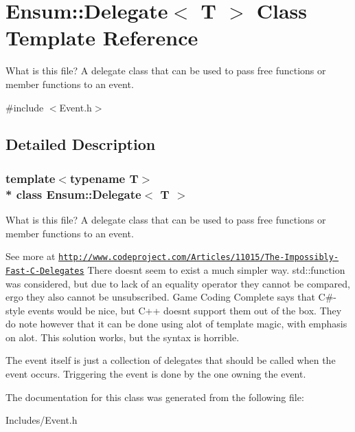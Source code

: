 \hypertarget{class_ensum_1_1_delegate}{}\section{Ensum\+:\+:Delegate$<$ T $>$ Class Template Reference}
\label{class_ensum_1_1_delegate}


What is this file? A delegate class that can be used to pass free functions or member functions to an event.  




{\ttfamily \#include $<$Event.\+h$>$}



\subsection{Detailed Description}
\subsubsection*{template$<$typename T$>$\\*
class Ensum\+::\+Delegate$<$ T $>$}

What is this file? A delegate class that can be used to pass free functions or member functions to an event. 

See more at \href{http://www.codeproject.com/Articles/11015/The-Impossibly-Fast-C-Delegates}{\tt http\+://www.\+codeproject.\+com/\+Articles/11015/\+The-\/\+Impossibly-\/\+Fast-\/\+C-\/\+Delegates} There doesn\textquotesingle{}t seem to exist a much simpler way. std\+::function was considered, but due to lack of an equality operator they cannot be compared, ergo they also cannot be unsubscribed. Game Coding Complete says that C\#-\/style events would be nice, but C++ doesn\textquotesingle{}t support them out of the box. They do note however that it can be done using alot of template magic, with emphasis on alot. This solution works, but the syntax is horrible.

The event itself is just a collection of delegates that should be called when the event occurs. Triggering the event is done by the one owning the event. 

The documentation for this class was generated from the following file\+:\begin{DoxyCompactItemize}
\item 
Includes/Event.\+h\end{DoxyCompactItemize}

